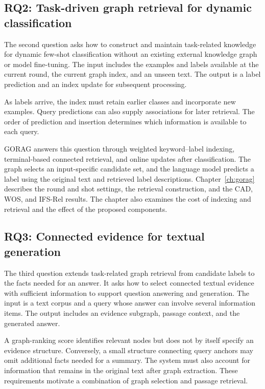 \subsection{RQ2: Task-driven graph retrieval for dynamic classification}
The second question asks how to construct and maintain task-related knowledge for dynamic few-shot classification without an existing external knowledge graph or model fine-tuning. The input includes the examples and labels available at the current round, the current graph index, and an unseen text. The output is a label prediction and an index update for subsequent processing.

As labels arrive, the index must retain earlier classes and incorporate new examples. Query predictions can also supply associations for later retrieval. The order of prediction and insertion determines which information is available to each query.

GORAG answers this question through weighted keyword--label indexing, terminal-based connected retrieval, and online updates after classification. The graph selects an input-specific candidate set, and the language model predicts a label using the original text and retrieved label descriptions. Chapter~\ref{ch:gorag} describes the round and shot settings, the retrieval construction, and the CAD, WOS, and IFS-Rel results. The chapter also examines the cost of indexing and retrieval and the effect of the proposed components.

\subsection{RQ3: Connected evidence for textual generation}
The third question extends task-related graph retrieval from candidate labels to the facts needed for an answer. It asks how to select connected textual evidence with sufficient information to support question answering and generation. The input is a text corpus and a query whose answer can involve several information items. The output includes an evidence subgraph, passage context, and the generated answer.

A graph-ranking score identifies relevant nodes but does not by itself specify an evidence structure. Conversely, a small structure connecting query anchors may omit additional facts needed for a summary. The system must also account for information that remains in the original text after graph extraction. These requirements motivate a combination of graph selection and passage retrieval.

